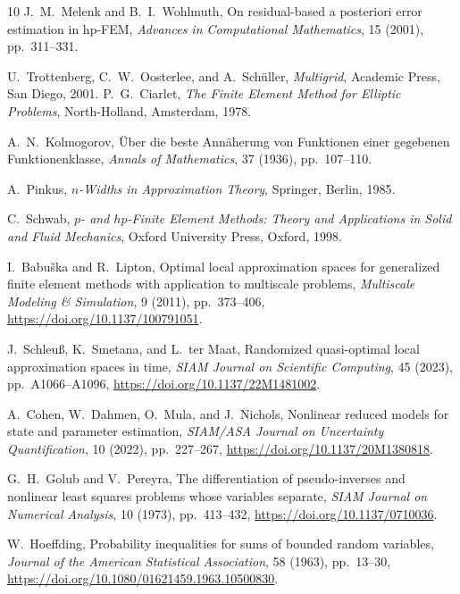 \documentclass[11pt]{article}
\numberwithin{algorithm}{section}
\theoremstyle{definition}\newtheorem{definition}[theorem]{Definition}
\theoremstyle{remark}\newtheorem{remark}[theorem]{Remark}
\begin{document}
\begin{thebibliography}{10}
J.~M.~Melenk and B.~I.~Wohlmuth,
\newblock On residual-based a posteriori error estimation in hp-FEM,
\newblock \emph{Advances in Computational Mathematics}, 15 (2001),
pp.~311--331.

U.~Trottenberg, C.~W.~Oosterlee, and A.~Sch\"uller,
\newblock \emph{Multigrid},
\newblock Academic Press, San Diego, 2001.
P.~G.~Ciarlet,
\newblock \emph{The Finite Element Method for Elliptic Problems},
\newblock North-Holland, Amsterdam, 1978.

A.~N.~Kolmogorov,
\newblock \"Uber die beste Ann\"aherung von Funktionen einer gegebenen
Funktionenklasse,
\newblock \emph{Annals of Mathematics}, 37 (1936), pp.~107--110.

A.~Pinkus,
\newblock \emph{$n$-Widths in Approximation Theory},
\newblock Springer, Berlin, 1985.

C.~Schwab,
\newblock \emph{$p$- and $hp$-Finite Element Methods: Theory and Applications
in Solid and Fluid Mechanics},
\newblock Oxford University Press, Oxford, 1998.

I.~Babu\v{s}ka and R.~Lipton,
\newblock Optimal local approximation spaces for generalized finite element
methods with application to multiscale problems,
\newblock \emph{Multiscale Modeling \& Simulation}, 9 (2011), pp.~373--406,
\newblock \url{https://doi.org/10.1137/100791051}.

J.~Schleu{\ss}, K.~Smetana, and L.~ter Maat,
\newblock Randomized quasi-optimal local approximation spaces in time,
\newblock \emph{SIAM Journal on Scientific Computing}, 45 (2023),
pp.~A1066--A1096,
\newblock \url{https://doi.org/10.1137/22M1481002}.

A.~Cohen, W.~Dahmen, O.~Mula, and J.~Nichols,
\newblock Nonlinear reduced models for state and parameter estimation,
\newblock \emph{SIAM/ASA Journal on Uncertainty Quantification}, 10 (2022),
pp.~227--267,
\newblock \url{https://doi.org/10.1137/20M1380818}.

G.~H.~Golub and V.~Pereyra,
\newblock The differentiation of pseudo-inverses and nonlinear least squares
problems whose variables separate,
\newblock \emph{SIAM Journal on Numerical Analysis}, 10 (1973),
pp.~413--432,
\newblock \url{https://doi.org/10.1137/0710036}.

W.~Hoeffding,
\newblock Probability inequalities for sums of bounded random variables,
\newblock \emph{Journal of the American Statistical Association}, 58 (1963),
pp.~13--30,
\newblock \url{https://doi.org/10.1080/01621459.1963.10500830}.


\end{thebibliography}
\end{document}
